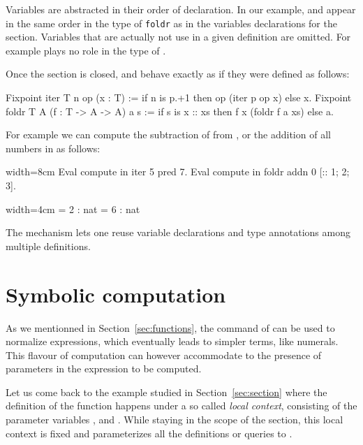 Variables are abstracted in their order of declaration.  In our example,
 and  appear in the same order in the type of {\tt foldr} as
in the variables declarations for the section.  Variables that are actually
not use in a given definition are omitted. For example  plays no
role in the type of .

Once the section is closed,  and  behave exactly as
if they were defined as follows:

\begin{coq}{}{}
Fixpoint iter T n op (x : T) :=
  if n is p.+1 then op (iter p op x) else x.
Fixpoint foldr T A (f : T -> A -> A) a s :=
  if s is x :: xs then f x (foldr f a xs) else a.
\end{coq}
For example we can compute the subtraction of  from , or the
addition of all numbers in \C{[:: 1; 2; 3]}
as follows:

\begin{coq}{}{width=8cm}
Eval compute in iter 5 pred 7.
Eval compute in foldr addn 0 [:: 1; 2; 3].
\end{coq}
\begin{coqout}{}{width=4cm}
 = 2 : nat
 = 6 : nat
\end{coqout}

The  mechanism lets one reuse variable declarations and type
annotations among multiple definitions.


\section{Symbolic computation}\label{sec:symcomp}

As we mentionned in Section~\ref{sec:functions}, the 
command of \Coq{} can be used to normalize expressions, which
eventually leads to simpler terms, like numerals. This flavour of
computation can however accommodate to the presence of parameters in
the expression to be computed.

Let us come back to the example studied in Section~\ref{sec:section} where
the definition of the  function happens under a so called
\emph{local context}, consisting of the parameter variables ,
 and . While staying in the scope of the 
section, this local context is fixed and parameterizes all the
definitions or queries to \Coq{}.

